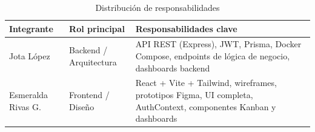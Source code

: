 \documentclass[12pt, a4paper]{article}
\begin{document}
\begin{table}[H]
\centering
\renewcommand{\arraystretch}{1.4}
\begin{tabularx}{\linewidth}{|l|X|X|}
\hline
\rowcolor{lightblue}
\textbf{Integrante} & \textbf{Rol principal} & \textbf{Responsabilidades clave} \\
\hline
Jota López & Backend / Arquitectura &
  API REST (Express), JWT, Prisma, Docker Compose, endpoints de lógica de negocio, dashboards backend \\
\hline
Esmeralda Rivas G. & Frontend / Diseño &
  React + Vite + Tailwind, wireframes, prototipos Figma, UI completa, AuthContext, componentes Kanban y dashboards \\
\hline
\end{tabularx}
\caption{Distribución de responsabilidades}
\end{table}
\end{document}

